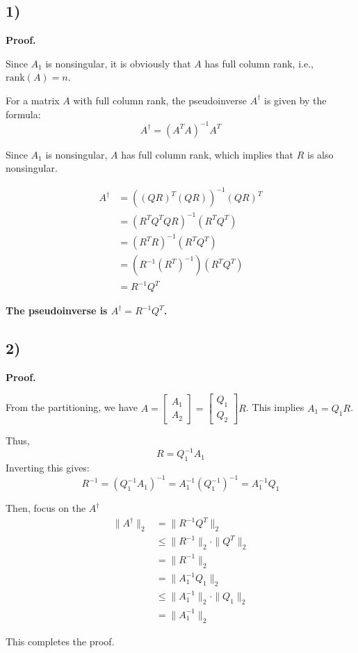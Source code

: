 \documentclass{article}
\newcommand{\0}{{\mathbf{0}}} %
\begin{document}
\subsection*{1)}
\textbf{Proof.}

Since $A_1$ is nonsingular, it is obviously that $A$ has full column rank, i.e., $\text{rank}(A) = n$.

For a matrix $A$ with full column rank, the pseudoinverse $A^\dagger$ is given by the formula:
$$
A^\dagger = (A^T A)^{-1} A^T
$$

Since $A_1$ is nonsingular, $A$ has full column rank, which implies that $R$ is also nonsingular.

\begin{align*}
A^\dagger &= \left( (QR)^T (QR) \right)^{-1} (QR)^T \\
&= \left( R^T Q^T Q R \right)^{-1} (R^T Q^T) \\
&= \left( R^T R \right)^{-1} (R^T Q^T) \\
&= \left( R^{-1} (R^T)^{-1} \right) (R^T Q^T) \\
&= R^{-1} Q^T
\end{align*}

\textbf{The pseudoinverse is $A^\dagger = R^{-1} Q^T$.}

\subsection*{2)}
\textbf{Proof.}

From the partitioning, we have $A =
\begin{bmatrix} A_1 \\ A_2
\end{bmatrix} =
\begin{bmatrix} Q_1 \\ Q_2
\end{bmatrix} R$.
This implies $A_1 = Q_1 R$.

Thus,
$$
R = Q_1^{-1} A_1
$$
Inverting this gives:
$$
R^{-1} = (Q_1^{-1} A_1)^{-1} = A_1^{-1} (Q_1^{-1})^{-1} = A_1^{-1} Q_1
$$

Then, focus on the $A^\dagger$
\begin{align*}
\|A^\dagger\|_2 &= \|R^{-1} Q^T\|_2  \\
&\le \|R^{-1}\|_2 \cdot \|Q^T\|_2 \\
&= \|R^{-1}\|_2 \label{eq:1} \\
&= \|A_1^{-1} Q_1\|_2 \\
&\le \|A_1^{-1}\|_2 \cdot \|Q_1\|_2 \\
&= \|A_1^{-1}\|_2
\end{align*}

This completes the proof.
\end{document}
